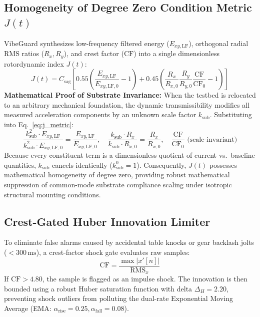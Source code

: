 \subsection{Homogeneity of Degree Zero Condition Metric $J(t)$}
\hspace{2em}VibeGuard synthesizes low-frequency filtered energy ($E_{xy,\mathrm{LF}}$), orthogonal radial RMS ratios ($R_x, R_y$), and crest factor ($\mathrm{CF}$) into a single dimensionless rotordynamic index $J(t)$:
\begin{equation}
J(t) = C_{\mathrm{sag}} \left[ 0.55 \left(\frac{E_{xy,\mathrm{LF}}}{E_{xy,\mathrm{LF},0}} - 1\right) + 0.45 \left(\frac{R_x}{R_{x,0}} \frac{R_y}{R_{y,0}} \frac{\mathrm{CF}}{\mathrm{CF}_0} - 1\right) \right]
\label{eq:j_metric}
\end{equation}
\textbf{Mathematical Proof of Substrate Invariance:} When the testbed is relocated to an arbitrary mechanical foundation, the dynamic transmissibility modifies all measured acceleration components by an unknown scale factor $k_{\mathrm{sub}}$. Substituting into Eq.~\eqref{eq:j_metric}:
\begin{equation}
\frac{k_{\mathrm{sub}}^2 \cdot E_{xy,\mathrm{LF}}}{k_{\mathrm{sub}}^2 \cdot E_{xy,\mathrm{LF},0}} = \frac{E_{xy,\mathrm{LF}}}{E_{xy,\mathrm{LF},0}}, \quad \frac{k_{\mathrm{sub}} \cdot R_x}{k_{\mathrm{sub}} \cdot R_{x,0}} = \frac{R_x}{R_{x,0}}, \quad \frac{\mathrm{CF}}{\mathrm{CF}_0} \text{ (scale-invariant)}
\end{equation}
Because every constituent term is a dimensionless quotient of current vs.\ baseline quantities, $k_{\mathrm{sub}}$ cancels identically ($k_{\mathrm{sub}}^0 = 1$). Consequently, $J(t)$ possesses mathematical homogeneity of degree zero, providing robust mathematical suppression of common-mode substrate compliance scaling under isotropic structural mounting conditions.

\subsection{Crest-Gated Huber Innovation Limiter}
\hspace{2em}To eliminate false alarms caused by accidental table knocks or gear backlash jolts ($<300\,\text{ms}$), a crest-factor shock gate evaluates raw samples:
\begin{equation}
\mathrm{CF} = \frac{\max |x'[n]|}{\mathrm{RMS}_x}
\end{equation}
If $\mathrm{CF} > 4.80$, the sample is flagged as an impulse shock. The innovation is then bounded using a robust Huber saturation function with delta $\Delta_H = 2.20$, preventing shock outliers from polluting the dual-rate Exponential Moving Average (EMA: $\alpha_{\mathrm{rise}} = 0.25, \alpha_{\mathrm{fall}} = 0.08$).

